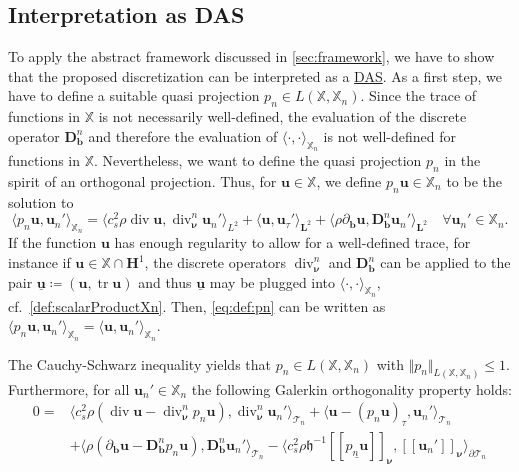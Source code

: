 \documentclass{m2an}
\newcommand{\inner}[1]{\langle #1 \rangle}
\newcommand{\innerr}[1]{\langle \rho#1 \rangle}
\newcommand{\innercsr}[1]{\langle c_s^2 \rho#1 \rangle}
\newcommand{\nv}{\boldsymbol{\nu}}
\newcommand{\bflow}{\mathbf{b}}
\renewcommand{\u}{\mathbf{u}}
\renewcommand{\div}{\operatorname{div}}
\DeclareMathOperator{\tr}{\mathrm{tr}}
\newcommand{\calT}{\mathcal{T}}
\newcommand{\X}{\mathbb{X}}
\newcommand{\Xn}{\mathbb{X}_n}
\newcommand{\bH}{{\mathbf H}}
\newcommand{\bD}{\mathbf{D}}
\newcommand{\bL}{\mathbf{L}}
\newcommand{\jump}[1]{[\![ #1 ]\!]}
\newcommand{\hdgjump}[1]{[\![\underline{#1} ]\!]}
\newcommand{\Tn}{\calT_n}
\newcommand{\spl}{\langle}
\newcommand{\spr}{\rangle}
\newcommand{\diffb}{\partial_{\bflow}}
\newcommand{\ddiffb}{\bD_{\bflow}^n}
\newcommand{\ddiv}{\div_{\nv}^n}
\newcommand{\PVol}[1]{(#1)_{\tau}}
\newcommand{\h}{\mathfrak{h}}
\newcommand{\DAS}{\hyperlink{DAS}{DAS}}
\theoremstyle{plain}
\theoremstyle{definition}
\begin{document}
\subsection{Interpretation as DAS}\label{subsec:method:DAS}
To apply the abstract framework discussed in \cref{sec:framework}, we have to show that the proposed discretization can be interpreted as a \DAS.
As a first step, we have to define a suitable quasi projection $p_n \in L(\X,\Xn)$. 
Since the trace of functions in $\X$ is not necessarily well-defined, the evaluation of the discrete operator $\ddiffb$ and therefore the evaluation of $\spl \cdot, \cdot \spr_{\Xn}$ is not well-defined for functions in $\X$. Nevertheless, we want to define the quasi projection $p_n$ in the spirit of an orthogonal projection. 
Thus, for $\u \in \X$, we define $p_n \u \in \X_n$ to be the solution to
\begin{equation}\label{eq:def:pn}
   \inner{p_n \u, \u_n'}_{\X_n} \! = \! \innercsr{\div \u, \ddiv \u_n'}_{L^2} + \inner{\u, \u_{\tau}'}_{\bL^2} + \innerr{\diffb \u, \ddiffb \u_n'}_{\bL^2} \! \!
   \quad \forall \u_n' \in \Xn.
\end{equation}
If the function $\u$ has enough regularity to allow for a well-defined trace, for instance if $\u \in \X \cap \bH^{1}$, the discrete operators $\ddiv$ and $\ddiffb$ can be applied to the pair $\underline{\u} \coloneqq (\u, \tr \u)$ and thus $\underline{\u}$ may be plugged into $\spl \cdot, \cdot \spr_{\Xn}$, cf.~\eqref{def:scalarProductXn}. Then, \eqref{eq:def:pn} can be written as $\spl p_n \u, \u_n' \spr_{\Xn} = \spl \u, \u_n' \spr_{\Xn}$.

The Cauchy-Schwarz inequality yields that $p_n \in L(\X,\X_n)$ with $\Vert p_n \Vert_{L(\X,\X_n)} \le 1$. Furthermore, for all $\u_n' \in \X_n$ the following Galerkin orthogonality property holds:
\begin{equation}\label{eq:GalerkinOrthogonality}
   \begin{aligned}
      0 = &\innercsr{(\div \u - \ddiv p_n \u), \ddiv \u_n'}_{\Tn} + \inner{\u - \PVol{p_n \u}, \u_n'}_{\Tn} \\
      &+ \innerr{(\diffb \u - \ddiffb p_n \u), \ddiffb \u_n'}_{\Tn} - \innercsr{\h^{-1} \hdgjump{p_n \u}_{\nv}, \jump{\u_n'}_{\nv}}_{\partial \Tn}
   \end{aligned}
\end{equation}
\end{document}
